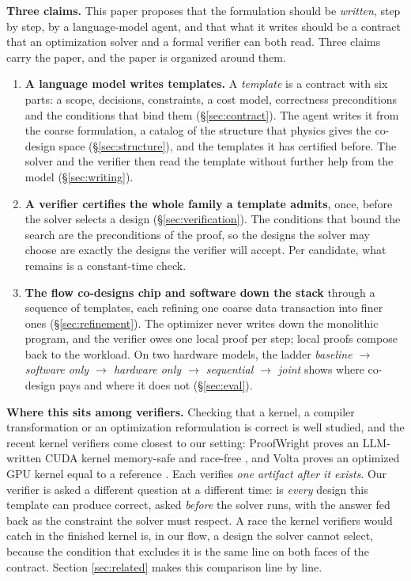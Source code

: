 \documentclass[11pt]{article}
\providecommand{\tightlist}{\setlength{\itemsep}{0pt}\setlength{\parskip}{0pt}}
\begin{document}
\textbf{Three claims.} This paper proposes that the formulation should be \emph{written}, step by step, by a language-model agent, and that what it writes should be a contract that an optimization solver and a formal verifier can both read. Three claims carry the paper, and the paper is organized around them.

\begin{enumerate}
\tightlist
\item
  \textbf{A language model writes templates.} A \emph{template} is a contract with six parts: a scope, decisions, constraints, a cost model, correctness preconditions and the conditions that bind them (§\ref{sec:contract}). The agent writes it from the coarse formulation, a catalog of the structure that physics gives the co-design space (§\ref{sec:structure}), and the templates it has certified before. The solver and the verifier then read the template without further help from the model (§\ref{sec:writing}).
\item
  \textbf{A verifier certifies the whole family a template admits}, once, before the solver selects a design (§\ref{sec:verification}). The conditions that bound the search are the preconditions of the proof, so the designs the solver may choose are exactly the designs the verifier will accept. Per candidate, what remains is a constant-time check.
\item
  \textbf{The flow co-designs chip and software down the stack} through a sequence of templates, each refining one coarse data transaction into finer ones (§\ref{sec:refinement}). The optimizer never writes down the monolithic program, and the verifier owes one local proof per step; local proofs compose back to the workload. On two hardware models, the ladder \emph{baseline $\to$ software only $\to$ hardware only $\to$ sequential $\to$ joint} shows where co-design pays and where it does not (§\ref{sec:eval}).
\end{enumerate}

\textbf{Where this sits among verifiers.} Checking that a kernel, a compiler transformation or an optimization reformulation is correct is well studied, and the recent kernel verifiers come closest to our setting: ProofWright proves an LLM-written CUDA kernel memory-safe and race-free \cite{r103}, and Volta proves an optimized GPU kernel equal to a reference \cite{r104}. Each verifies \emph{one artifact after it exists}. Our verifier is asked a different question at a different time: is \emph{every} design this template can produce correct, asked \emph{before} the solver runs, with the answer fed back as the constraint the solver must respect. A race the kernel verifiers would catch in the finished kernel is, in our flow, a design the solver cannot select, because the condition that excludes it is the same line on both faces of the contract. Section \ref{sec:related} makes this comparison line by line.
\end{document}
